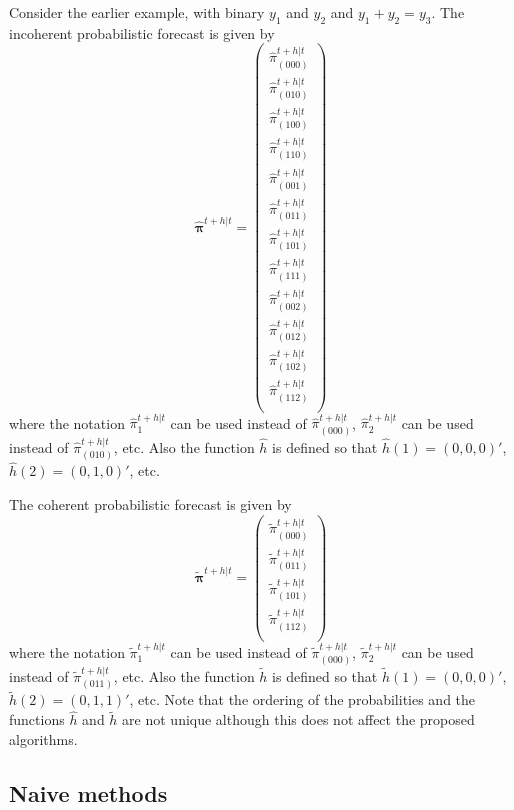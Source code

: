 \documentclass[a4paper,review,12pt,authoryear]{elsarticle}
\newcommand{\bpi}{\bm{\pi}}
\begin{document}
    Consider the earlier example, with binary $y_1$ and $y_2$ and $y_1+y_2=y_3$. The incoherent probabilistic forecast is given by
    \[
      \hat{\bpi}^{t+h|t}=\begin{pmatrix}
         \hat{\pi}^{t+h|t}_{(000)}\\
         \hat{\pi}^{t+h|t}_{(010)}\\
         \hat{\pi}^{t+h|t}_{(100)}\\
         \hat{\pi}^{t+h|t}_{(110)}\\
         \hat{\pi}^{t+h|t}_{(001)}\\
         \hat{\pi}^{t+h|t}_{(011)}\\
         \hat{\pi}^{t+h|t}_{(101)}\\
         \hat{\pi}^{t+h|t}_{(111)}\\
         \hat{\pi}^{t+h|t}_{(002)}\\
         \hat{\pi}^{t+h|t}_{(012)}\\
         \hat{\pi}^{t+h|t}_{(102)}\\
         \hat{\pi}^{t+h|t}_{(112)}\\
      \end{pmatrix}
    \]
    where the notation $\hat{\pi}^{t+h|t}_{1}$ can be used instead of $\hat{\pi}^{t+h|t}_{(000)}$, $\hat{\pi}^{t+h|t}_{2}$ can be used instead of $\hat{\pi}^{t+h|t}_{(010)}$, etc. Also the function $\hat{h}$ is defined so that $\hat{h}(1)=(0,0,0)'$, $\hat{h}(2)=(0,1,0)'$, etc.
    
    The coherent probabilistic forecast is given by
    \[
    \tilde{\bpi}^{t+h|t}=\begin{pmatrix}
    \tilde{\pi}^{t+h|t}_{(000)}\\
    \tilde{\pi}^{t+h|t}_{(011)}\\
    \tilde{\pi}^{t+h|t}_{(101)}\\
    \tilde{\pi}^{t+h|t}_{(112)}\\
    \end{pmatrix}
    \]
    where the notation $\tilde{\pi}^{t+h|t}_{1}$ can be used instead of $\tilde{\pi}^{t+h|t}_{(000)}$, $\tilde{\pi}^{t+h|t}_{2}$ can be used instead of $\tilde{\pi}^{t+h|t}_{(011)}$, etc. Also the function $\tilde{h}$ is defined so that $\tilde{h}(1)=(0,0,0)'$, $\tilde{h}(2)=(0,1,1)'$, etc. Note that the ordering of the probabilities and the functions $\hat{h}$ and $\tilde{h}$ are not unique although this does not affect the proposed algorithms.
    
    \subsection{Naive methods}
\end{document}
